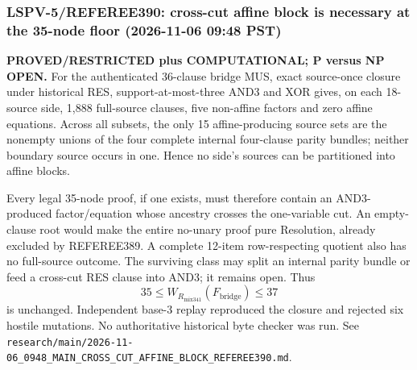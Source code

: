 \subsubsection*{LSPV-5/REFEREE390: cross-cut affine block is necessary at the 35-node floor (2026-11-06 09:48 PST)}

\textbf{PROVED/RESTRICTED plus COMPUTATIONAL; P versus NP OPEN.}
For the authenticated 36-clause bridge MUS, exact source-once closure under historical RES, support-at-most-three AND3 and XOR gives, on each 18-source side, 1,888 full-source clauses, five non-affine factors and zero affine equations. Across all subsets, the only 15 affine-producing source sets are the nonempty unions of the four complete internal four-clause parity bundles; neither boundary source occurs in one. Hence no side's sources can be partitioned into affine blocks.

Every legal 35-node proof, if one exists, must therefore contain an AND3-produced factor/equation whose ancestry crosses the one-variable cut. An empty-clause root would make the entire no-unary proof pure Resolution, already excluded by REFEREE389. A complete 12-item row-respecting quotient also has no full-source outcome. The surviving class may split an internal parity bundle or feed a cross-cut RES clause into AND3; it remains open. Thus
\[
35\le W_{R_{\mathrm{mix341}}}(F_{\mathrm{bridge}})\le37
\]
is unchanged. Independent base-3 replay reproduced the closure and rejected six hostile mutations. No authoritative historical byte checker was run. See \texttt{research/main/2026-11-06\_0948\_MAIN\_CROSS\_CUT\_AFFINE\_BLOCK\_REFEREE390.md}.
